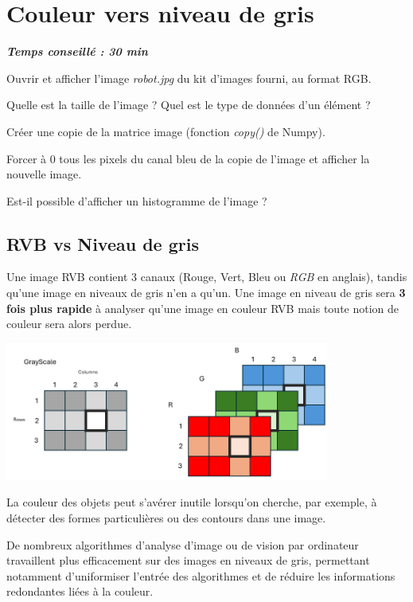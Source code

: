 \documentclass[a4paper,11pt,titlepage]{article} %
\begin{document}
\section{Couleur vers niveau de gris}

\begin{center} \textbf{\textit{Temps conseillé : 30 min}} \end{center}

\Manip Ouvrir et afficher l'image \textsl{robot.jpg} du kit d'images fourni, au format RGB.

\Quest Quelle est la taille de l'image ? Quel est le type de données d'un élément ?

\Manip Créer une copie de la matrice image (fonction \textsl{copy()} de Numpy). 

\Manip Forcer à 0 tous les pixels du canal bleu de la copie de l'image et afficher la nouvelle image.

\Quest Est-il possible d'afficher un histogramme de l'image ? 


\subsection{RVB vs Niveau de gris}

Une image RVB contient 3 canaux (Rouge, Vert, Bleu ou \textit{RGB} en anglais), tandis qu'une image en niveaux de gris n'en a qu'un. Une image en niveau de gris sera \textbf{3 fois plus rapide} à analyser qu'une image en couleur RVB mais toute notion de couleur sera alors perdue.

\begin{center}
	\includegraphics[width=0.8\textwidth]{images/images_array_gray_rgb.png}
\end{center}


La couleur des objets peut s'avérer inutile lorsqu'on cherche, par exemple, à détecter des formes particulières ou des contours dans une image.

De nombreux algorithmes d'analyse d'image ou de vision par ordinateur travaillent plus efficacement sur des images en niveaux de gris, permettant notamment d'uniformiser l'entrée des algorithmes et de réduire les informations redondantes liées à la couleur.
\end{document}

